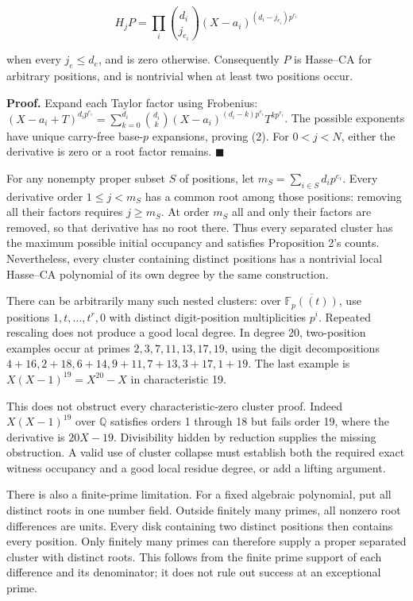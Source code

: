 \documentclass[
  british,
  10pt,
]{article}
\newcounter{none} %
\begin{document}
\[
 H_jP=\prod_i\binom{d_i}{j_{e_i}}
            (X-a_i)^{(d_i-j_{e_i})p^{e_i}}                 \tag{2}
\]

when every \(j_e\le d_e\), and is zero otherwise. Consequently \(P\) is
Hasse--CA for arbitrary positions, and is nontrivial when at least two
positions occur.

\textbf{Proof.} Expand each Taylor factor using Frobenius:
\((X-a_i+T)^{d_ip^{e_i}}
=\sum_{k=0}^{d_i}\binom{d_i}k(X-a_i)^{(d_i-k)p^{e_i}}T^{kp^{e_i}}\). The
possible exponents have unique carry-free base-\(p\) expansions, proving
(2). For \(0<j<N\), either the derivative is zero or a root factor
remains. \(\blacksquare\)

For any nonempty proper subset \(S\) of positions, let
\(m_S=\sum_{i\in S}d_ip^{e_i}\). Every derivative order \(1\le j<m_S\)
has a common root among those positions: removing all their factors
requires \(j\ge m_S\). At order \(m_S\) all and only their factors are
removed, so that derivative has no root there. Thus every separated
cluster has the maximum possible initial occupancy and satisfies
Proposition 2's counts. Nevertheless, every cluster containing distinct
positions has a nontrivial local Hasse--CA polynomial of its own degree
by the same construction.

There can be arbitrarily many such nested clusters: over
\(\overline{\mathbb F_p((t))}\), use positions \(1,t,\ldots,t^r,0\) with
distinct digit-position multiplicities \(p^i\). Repeated rescaling does
not produce a good local degree. In degree 20, two-position examples
occur at primes \(2,3,7,11,13,17,19\), using the digit decompositions
\(4+16,2+18,6+14,9+11,7+13,3+17,1+19\). The last example is
\(X(X-1)^{19}=X^{20}-X\) in characteristic 19.

This does not obstruct every characteristic-zero cluster proof. Indeed
\(X(X-1)^{19}\) over \(\mathbb Q\) satisfies orders 1 through 18 but
fails order 19, where the derivative is \(20X-19\). Divisibility hidden
by reduction supplies the missing obstruction. A valid use of cluster
collapse must establish both the required exact witness occupancy and a
good local residue degree, or add a lifting argument.

There is also a finite-prime limitation. For a fixed algebraic
polynomial, put all distinct roots in one number field. Outside finitely
many primes, all nonzero root differences are units. Every disk
containing two distinct positions then contains every position. Only
finitely many primes can therefore supply a proper separated cluster
with distinct roots. This follows from the finite prime support of each
difference and its denominator; it does not rule out success at an
exceptional prime.
\end{document}
